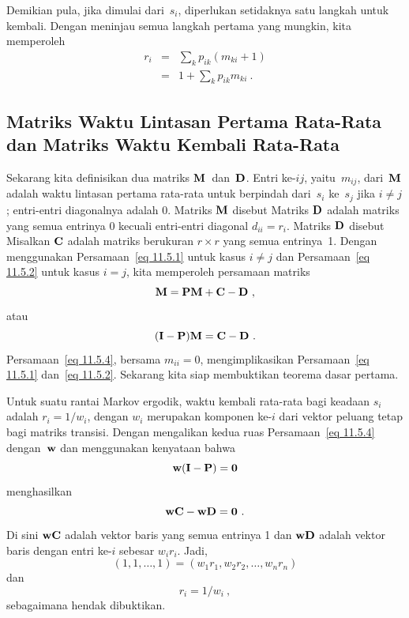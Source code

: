 Demikian pula, jika dimulai dari~$s_i$, diperlukan setidaknya satu langkah untuk
kembali. Dengan meninjau semua langkah pertama yang mungkin, kita memperoleh
\begin{eqnarray}
r_i &=& \sum_k p_{ik}(m_{ki} + 1) \\
    &=& 1 + \sum_k p_{ik} m_{ki}\ .\label{eq 11.5.2}
\end{eqnarray}

\subsection*{Matriks Waktu Lintasan Pertama Rata-Rata dan Matriks Waktu Kembali
Rata-Rata}
Sekarang kita definisikan dua matriks ${\mbox{\bf M}\/}$~dan~${\mbox{\bf D}\/}$. Entri
ke-$ij$, yaitu~$m_{ij}$, dari~${\mbox{\bf M}\/}$ adalah waktu lintasan pertama rata-rata
untuk berpindah dari~$s_i$ ke~$s_j$ jika $i \ne j$; entri-entri diagonalnya
adalah 0. Matriks ${\mbox{\bf M}\/}$ disebut  Matriks ${\mbox{\bf D}\/}$
adalah matriks yang semua entrinya 0 kecuali entri-entri diagonal $d_{ii} = r_i$.
Matriks ${\mbox{\bf D}\/}$ disebut 
Misalkan ${\mbox{\bf C}\/}$ adalah matriks berukuran $r \times r$ yang semua entrinya~1.
Dengan menggunakan Persamaan~\ref{eq 11.5.1} untuk kasus $i \ne j$ dan
Persamaan~\ref{eq 11.5.2} untuk kasus $i = j$, kita memperoleh persamaan matriks
\begin{equation}
{\mbox{\bf M}\/} = {\mbox{\bf P}\/} {\mbox{\bf M}\/} + {\mbox{\bf C}\/} - {\mbox{\bf D}\/}\ ,  
\label{eq 11.5.3}
\end{equation}
atau
\begin{equation}
({\mbox{\bf I}\/} - {\mbox{\bf P}\/}) {\mbox{\bf M}\/} = {\mbox{\bf C}\/} - {\mbox{\bf D}\/}\ . 
\label{eq 11.5.4}
\end{equation}
Persamaan~\ref{eq 11.5.4}, bersama $m_{ii} = 0$, mengimplikasikan
Persamaan~\ref{eq 11.5.1} dan~\ref{eq 11.5.2}. Sekarang kita siap membuktikan
teorema dasar pertama.

\begin{theorem}
Untuk suatu rantai Markov ergodik, waktu kembali rata-rata bagi keadaan $s_i$
adalah $r_i = 1/w_i$, dengan $w_i$ merupakan komponen ke-$i$ dari vektor peluang
tetap bagi matriks transisi.
\proof
Dengan mengalikan kedua ruas Persamaan~\ref{eq 11.5.4} dengan~${\mbox{\bf w}\/}$ dan
menggunakan kenyataan bahwa
$$
{\mbox{\bf w}\/}({\mbox{\bf I}\/} - {\mbox{\bf P}\/}) = {\mbox{\bf0}\/}
$$ 
menghasilkan
$$
{\mbox{\bf w}\/} {\mbox{\bf C}\/} - {\mbox{\bf w}\/} {\mbox{\bf D}\/} = {\mbox{\bf0}\/}\ .
$$
Di sini ${\mbox{\bf w}\/} {\mbox{\bf C}\/}$ adalah vektor baris yang semua entrinya 1 dan
${\mbox{\bf w}\/} {\mbox{\bf D}\/}$ adalah vektor baris dengan entri ke-$i$ sebesar $w_i r_i$.
Jadi,
$$
(1,1,\ldots,1) = (w_1r_1,w_2r_2,\ldots,w_nr_n)
$$
dan
$$
r_i = 1/w_i\ ,
$$
sebagaimana hendak dibuktikan.
\end{theorem}

